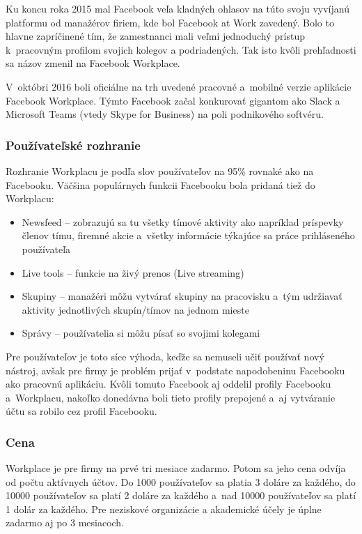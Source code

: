 \indent Ku koncu roka 2015 mal Facebook veľa kladných ohlasov na túto svoju vyvíjanú platformu od manažérov firiem, kde bol Facebook at Work zavedený. Bolo to hlavne zapríčinené tím, že zamestnanci mali veľmi jednoduchý prístup k pracovným profilom svojich kolegov a podriadených. Tak isto kvôli prehľadnosti sa názov zmenil na Facebook Workplace.

\indent  V októbri 2016 boli oficiálne na trh uvedené pracovné a mobilné verzie aplikácie Facebook Workplace. Týmto Facebook začal konkurovať gigantom ako Slack a Microsoft Teams (vtedy Skype for Business) na poli podnikového softvéru.
\subsubsection{Používateľské rozhranie}
\indent Rozhranie Workplacu je podľa slov používateľov na 95\% rovnaké ako na Facebooku. Väčšina populárnych funkcii Facebooku bola pridaná tiež do Workplacu:
\begin{itemize}
    \item Newsfeed – zobrazujú sa tu všetky tímové aktivity ako napríklad príspevky členov tímu, firemné akcie a všetky informácie týkajúce sa práce prihláseného používateľa
    \item Live tools – funkcie na živý prenos (Live streaming)
    \item Skupiny – manažéri môžu vytvárať skupiny na pracovisku a tým udržiavať aktivity jednotlivých skupín/tímov na jednom  mieste
    \item Správy – používatelia si môžu písať so svojimi kolegami
\end{itemize}

\indent Pre používateľov je toto síce výhoda, keďže sa nemuseli učiť používať nový nástroj, avšak pre firmy je problém prijať v podstate napodobeninu Facebooku ako pracovnú aplikáciu. Kvôli tomuto Facebook aj oddelil profily Facebooku a Workplacu, nakoľko donedávna boli tieto profily prepojené a aj vytváranie účtu sa robilo cez profil Facebooku. 
\subsubsection{Cena}
\indent Workplace je pre firmy na prvé tri mesiace zadarmo. Potom sa jeho cena odvíja od počtu aktívnych účtov. Do 1000 používateľov sa platia 3 doláre za každého, do 10000 používateľov sa platí 2 doláre za každého a nad 10000 používateľov sa platí 1 dolár za každého.  Pre neziskové organizácie a akademické účely je úplne zadarmo aj po 3 mesiacoch.

